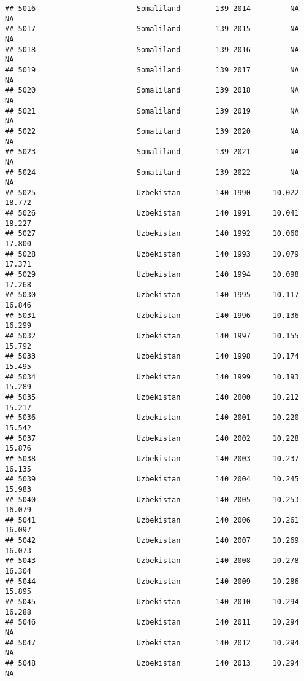\documentclass[
]{article}
\begin{document}
\begin{verbatim}
## 5016                       Somaliland        139 2014         NA         NA
## 5017                       Somaliland        139 2015         NA         NA
## 5018                       Somaliland        139 2016         NA         NA
## 5019                       Somaliland        139 2017         NA         NA
## 5020                       Somaliland        139 2018         NA         NA
## 5021                       Somaliland        139 2019         NA         NA
## 5022                       Somaliland        139 2020         NA         NA
## 5023                       Somaliland        139 2021         NA         NA
## 5024                       Somaliland        139 2022         NA         NA
## 5025                       Uzbekistan        140 1990     10.022     18.772
## 5026                       Uzbekistan        140 1991     10.041     18.227
## 5027                       Uzbekistan        140 1992     10.060     17.800
## 5028                       Uzbekistan        140 1993     10.079     17.371
## 5029                       Uzbekistan        140 1994     10.098     17.268
## 5030                       Uzbekistan        140 1995     10.117     16.846
## 5031                       Uzbekistan        140 1996     10.136     16.299
## 5032                       Uzbekistan        140 1997     10.155     15.792
## 5033                       Uzbekistan        140 1998     10.174     15.495
## 5034                       Uzbekistan        140 1999     10.193     15.289
## 5035                       Uzbekistan        140 2000     10.212     15.217
## 5036                       Uzbekistan        140 2001     10.220     15.542
## 5037                       Uzbekistan        140 2002     10.228     15.876
## 5038                       Uzbekistan        140 2003     10.237     16.135
## 5039                       Uzbekistan        140 2004     10.245     15.983
## 5040                       Uzbekistan        140 2005     10.253     16.079
## 5041                       Uzbekistan        140 2006     10.261     16.097
## 5042                       Uzbekistan        140 2007     10.269     16.073
## 5043                       Uzbekistan        140 2008     10.278     16.304
## 5044                       Uzbekistan        140 2009     10.286     15.895
## 5045                       Uzbekistan        140 2010     10.294     16.288
## 5046                       Uzbekistan        140 2011     10.294         NA
## 5047                       Uzbekistan        140 2012     10.294         NA
## 5048                       Uzbekistan        140 2013     10.294         NA

\end{verbatim}
\end{document}
